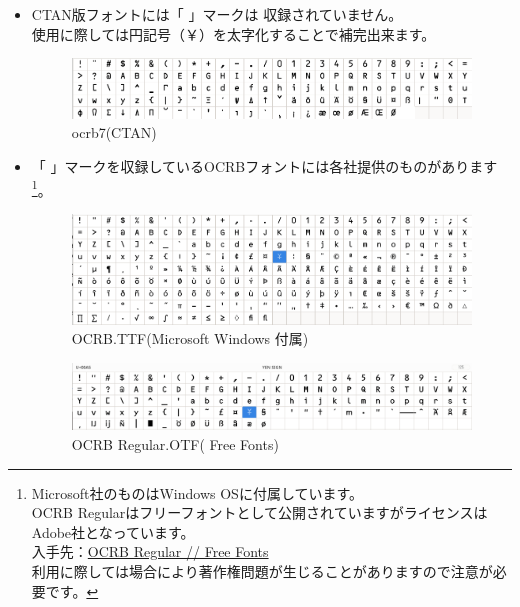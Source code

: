 \documentclass[a4paper,10pt,titlepage,pdfusetitle]{ltjsarticle}
\def\colH#1{\color[HTML]{#1}}
\begin{document}
{\begin{itemize}

  \item CTAN版フォントには「{ }」マークは 収録されていません。\\使用に際しては{\colH{800000}円記号（￥）を太字化}することで補完出来ます。\\
\vspace{-6mm}
\begin{figure}[H]
\centering
\includegraphics[width=14cm]{./images/ocrb-ttf01.png}
\caption{ocrb7(CTAN)} 
\end{figure}
\vspace{-6mm}

  \item 「{ }」マークを収録しているOCRBフォントには各社提供のものがあります\footnote{Microsoft社のものはWindows OSに付属しています。\\OCRB Regularはフリーフォントとして公開されていますがライセンスはAdobe社となっています。\\入手先：\href{https://freefonts.co/fonts/ocrb-regular}{OCRB Regular // Free Fonts}\\利用に際しては場合により著作権問題が生じることがありますので注意が必要です。}。

\vspace{-2mm}
  
\begin{figure}[H]
\centering
\includegraphics[width=14cm]{./images/ocrb-ttf-ms2.png}
\caption{OCRB.TTF(Microsoft Windows 付属)} 
\end{figure}
\vspace{-6mm}

\begin{figure}[H]
\centering
\includegraphics[width=14cm]{./images/ocrb-regular02.png}
\caption{OCRB Regular.OTF( Free Fonts)} 
\end{figure}


\end{itemize}}
\end{document}
